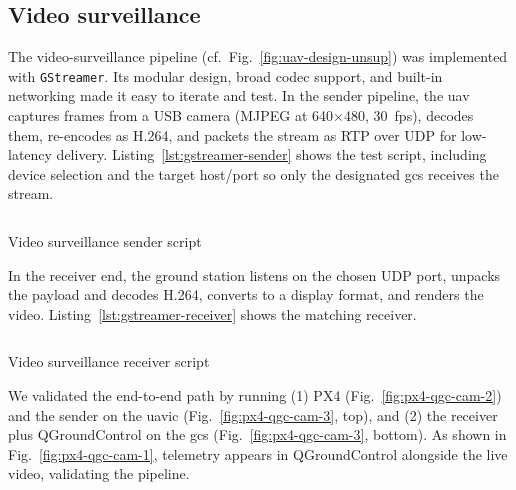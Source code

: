 \subsection{Video surveillance}
\label{sec:video-surveillance}
The video-surveillance pipeline (cf.\ Fig.~\ref{fig:uav-design-unsup}) was
implemented with \lstinline{GStreamer}. Its modular design, broad codec support,
and built-in networking made it easy to iterate and test.
In the sender pipeline, the \gls{uav} captures frames from a USB camera (MJPEG at
640{\(\times\)}480, 30~\gls{fps}), decodes them, re-encodes as H.264, and packets the stream as
RTP over UDP for low-latency delivery. Listing~\ref{lst:gstreamer-sender} shows
the test script, including device selection and the target host/port so only the
designated \gls{gcs} receives the stream.

\begin{longlisting}
\centering
\inputminted[]{bash}{./listing/gstreamerSender.sh}
\caption{Video surveillance sender script}
\label{lst:gstreamer-sender}
\end{longlisting}

In the receiver end, the ground station listens on the chosen UDP port,
unpacks the payload and decodes H.264, converts to a display format, and renders the video.
Listing~\ref{lst:gstreamer-receiver} shows the matching receiver.

\begin{longlisting}
\centering
\inputminted[]{bash}{./listing/gstreamerReceiver.sh}
\caption{Video surveillance receiver script}
\label{lst:gstreamer-receiver}
\end{longlisting}

We validated the end-to-end path by running (1) PX4 (Fig.~\ref{fig:px4-qgc-cam-2})
and the sender on the \gls{uavic} (Fig.~\ref{fig:px4-qgc-cam-3}, top), and
(2) the receiver plus QGroundControl on the \gls{gcs}
(Fig.~\ref{fig:px4-qgc-cam-3}, bottom). As shown in
Fig.~\ref{fig:px4-qgc-cam-1}, telemetry appears in QGroundControl alongside the
live video, validating the pipeline.


